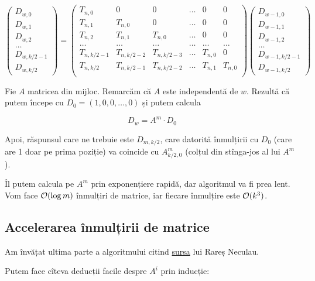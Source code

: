 \documentclass[../main.tex]{subfiles}
\begin{document}
$$
\begin{pmatrix}
  D_{w,0} \\ D_{w,1} \\ D_{w,2} \\ \dots \\ D_{w,k/2-1} \\ D_{w,k/2}
\end{pmatrix}
=
\begin{pmatrix}
  T_{n,0} & 0 & 0 & \dots & 0 & 0 \\
  T_{n,1} & T_{n,0} & 0 & \dots & 0 & 0 \\
  T_{n,2} & T_{n,1} & T_{n,0} & \dots & 0 & 0 \\
  \dots & \dots & \dots & \dots & \dots & \dots \\
  T_{n,k/2-1} & T_{n,k/2-2} & T_{n,k/2-3} & \dots & T_{n,0} & 0 \\
  T_{n,k/2} & T_{n,k/2-1} & T_{n,k/2-2} & \dots & T_{n,1} & T_{n,0} \\
\end{pmatrix}
\begin{pmatrix}
  D_{w-1,0} \\ D_{w-1,1} \\ D_{w-1,2} \\ \dots \\ D_{w-1,k/2-1} \\ D_{w-1,k/2}
\end{pmatrix}
$$

Fie $A$ matricea din mijloc. Remarcăm că $A$ este independentă de $w$. Rezultă că putem începe cu $D_0 = (1, 0, 0, \dots, 0)$ și putem calcula

$$D_w = A^m \cdot D_0$$

Apoi, răspunsul care ne trebuie este $D_{m,k/2}$, care datorită înmulțirii cu $D_0$ (care are 1 doar pe prima poziție) va coincide cu $A^m_{k/2,0}$ (colțul din stînga-jos al lui $A^m$).

Îl putem calcula pe $A^m$ prin exponențiere rapidă, dar algoritmul va fi prea lent. Vom face $\mathcal{O}(\log m)$ înmulțiri de matrice, iar fiecare înmulțire este $\mathcal{O}(k^3)$.

\subsection*{Accelerarea înmulțirii de matrice}

Am învățat ultima parte a algoritmului citind \href{https://kilonova.ro/submissions/684891}{sursa} lui Rareș Neculau.

Putem face cîteva deducții facile despre $A^i$ prin inducție:
\end{document}
